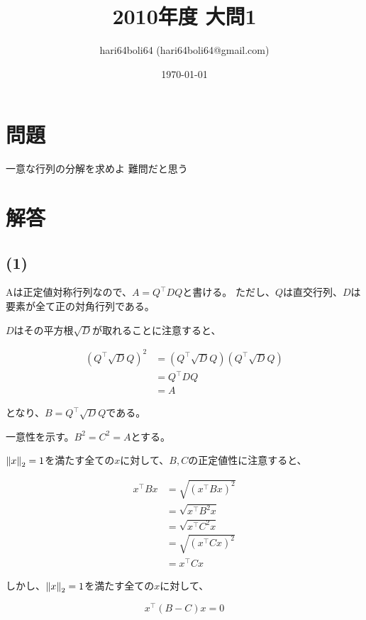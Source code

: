 \documentclass[a4paper, 10pt, dvipdfmx]{jlreq}
\begin{document}
\title{2010年度 大問1}
\author{hari64boli64 (hari64boli64@gmail.com)}
\date{\today}
\maketitle

\section{問題}

一意な行列の分解を求めよ 難問だと思う

\section{解答}

\subsection*{(1)}

Aは正定値対称行列なので、$A=Q^\top DQ$と書ける。
ただし、$Q$は直交行列、$D$は要素が全て正の対角行列である。

$D$はその平方根$\sqrt{D}$が取れることに注意すると、

\begin{align*}
  (Q^\top \sqrt{D}Q)^2 & =(Q^\top \sqrt{D}Q)(Q^\top \sqrt{D}Q) \\
                       & =Q^\top DQ                            \\
                       & =A
\end{align*}

となり、$B=Q^\top \sqrt{D}Q$である。

一意性を示す。$B^2=C^2=A$とする。

$\norm{x}_2=1$を満たす全ての$x$に対して、$B,C$の正定値性に注意すると、

\begin{align*}
  x^\top Bx & =\sqrt{(x^\top Bx)^2} \\
            & =\sqrt{x^\top B^2x}   \\
            & =\sqrt{x^\top C^2x}   \\
            & =\sqrt{(x^\top Cx)^2} \\
            & =x^\top Cx
\end{align*}

しかし、$\norm{x}_2=1$を満たす全ての$x$に対して、

\begin{equation*}
  x^\top (B-C)x =0
\end{equation*}
\end{document}
